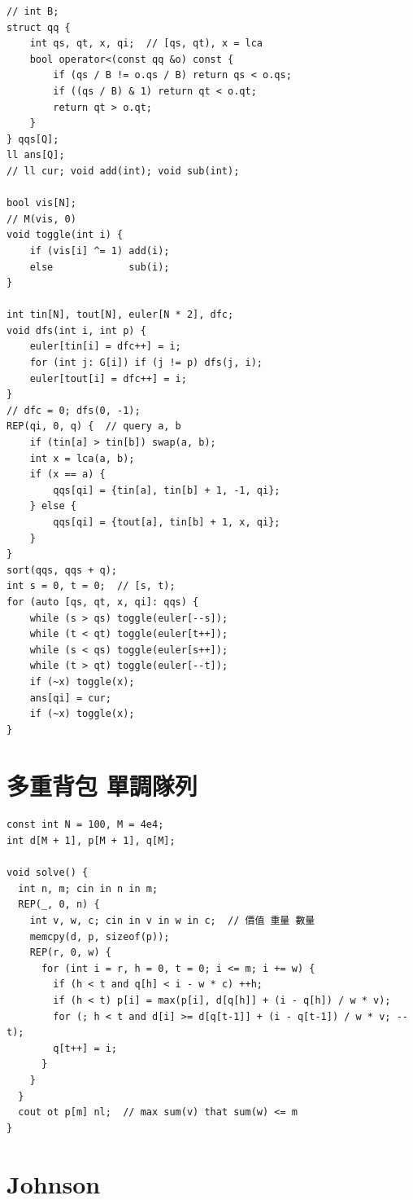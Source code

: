 \documentclass[10pt, a4paper, twocolumn]{article}
\begin{document}
\begin{verbatim}
// int B;
struct qq {
    int qs, qt, x, qi;  // [qs, qt), x = lca
    bool operator<(const qq &o) const {
        if (qs / B != o.qs / B) return qs < o.qs;
        if ((qs / B) & 1) return qt < o.qt;
        return qt > o.qt;
    }
} qqs[Q];
ll ans[Q];
// ll cur; void add(int); void sub(int);

bool vis[N];
// M(vis, 0)
void toggle(int i) {
    if (vis[i] ^= 1) add(i);
    else             sub(i);
}

int tin[N], tout[N], euler[N * 2], dfc;
void dfs(int i, int p) {
    euler[tin[i] = dfc++] = i;
    for (int j: G[i]) if (j != p) dfs(j, i);
    euler[tout[i] = dfc++] = i;
}
// dfc = 0; dfs(0, -1);
REP(qi, 0, q) {  // query a, b
    if (tin[a] > tin[b]) swap(a, b);
    int x = lca(a, b);
    if (x == a) {
        qqs[qi] = {tin[a], tin[b] + 1, -1, qi};
    } else {
        qqs[qi] = {tout[a], tin[b] + 1, x, qi};
    }
}
sort(qqs, qqs + q);
int s = 0, t = 0;  // [s, t);
for (auto [qs, qt, x, qi]: qqs) {
    while (s > qs) toggle(euler[--s]);
    while (t < qt) toggle(euler[t++]);
    while (s < qs) toggle(euler[s++]);
    while (t > qt) toggle(euler[--t]);
    if (~x) toggle(x);
    ans[qi] = cur;
    if (~x) toggle(x);
}
\end{verbatim}

\section{多重背包 單調隊列}

\begin{verbatim}
const int N = 100, M = 4e4;
int d[M + 1], p[M + 1], q[M];

void solve() {
  int n, m; cin in n in m;
  REP(_, 0, n) {
    int v, w, c; cin in v in w in c;  // 價值 重量 數量
    memcpy(d, p, sizeof(p));
    REP(r, 0, w) {
      for (int i = r, h = 0, t = 0; i <= m; i += w) {
        if (h < t and q[h] < i - w * c) ++h;
        if (h < t) p[i] = max(p[i], d[q[h]] + (i - q[h]) / w * v);
        for (; h < t and d[i] >= d[q[t-1]] + (i - q[t-1]) / w * v; --t);
        q[t++] = i;
      }
    }
  }
  cout ot p[m] nl;  // max sum(v) that sum(w) <= m
}
\end{verbatim}

\section{Johnson}
\end{document}
